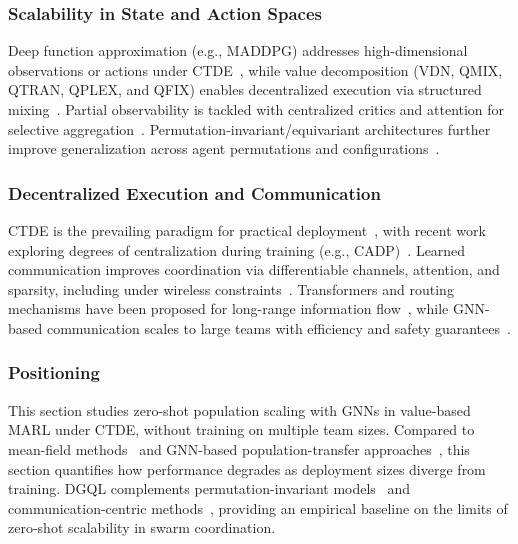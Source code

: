 \subsubsection{Scalability in State and Action Spaces}
Deep function approximation (e.g., MADDPG) addresses high-dimensional observations 
 or actions under CTDE~\cite{DBLP:conf/nips/LoweWTHAM17}, 
 while value decomposition (VDN, QMIX, QTRAN, QPLEX, and QFIX) 
 enables decentralized execution via structured 
 mixing~\cite{DBLP:conf/aaai/SunehagLGCZJLSL18,DBLP:conf/icml/RashidSWFFW18,son2019qtran,wang2021qplex,baisero2025fixing}. 
% 
Partial observability is tackled with centralized critics 
 and attention for selective aggregation~\cite{foerster2018counterfactual,zhang2021multi}. 
% 
Permutation-invariant/equivariant architectures further improve generalization across agent 
 permutations and configurations~\cite{peng2021permutation,hao2023boosting}.

\subsubsection{Decentralized Execution and Communication}
CTDE is the prevailing paradigm for practical deployment~\cite{amato2024introduction}, 
 with recent work exploring degrees of centralization during training 
 (e.g., CADP)~\cite{zhou2023centralized}. 
%
Learned communication improves coordination via differentiable 
 channels, attention, and sparsity, including under wireless 
 constraints~\cite{DBLP:conf/nips/SukhbaatarSF16,das2019tarmac,singh2019learning,hu2023learning}. 
%
Transformers and routing mechanisms have been proposed 
 for long-range information flow~\cite{zhang2024complementary,guo2023scalable}, 
 while \gls{GNN}-based communication scales to large teams with efficiency 
 and safety guarantees~\cite{liu2024graph,du2025scalable}.

\subsubsection{Positioning}
This section studies zero-shot population scaling with \glspl{GNN} in value-based \gls{MARL} under CTDE, 
 without training on multiple team sizes. 
%
Compared to mean-field methods~\cite{DBLP:conf/icml/YangLLZZWY18} 
 and GNN-based population-transfer approaches~\cite{nayak2023scalable}, 
 this section quantifies how performance degrades as deployment sizes diverge from training. 
%
DGQL complements permutation-invariant models~\cite{hao2023boosting,lin2024hgap} 
 and communication-centric methods~\cite{guo2023scalable,du2025scalable}, 
 providing an empirical baseline on the limits of zero-shot scalability in swarm coordination.

